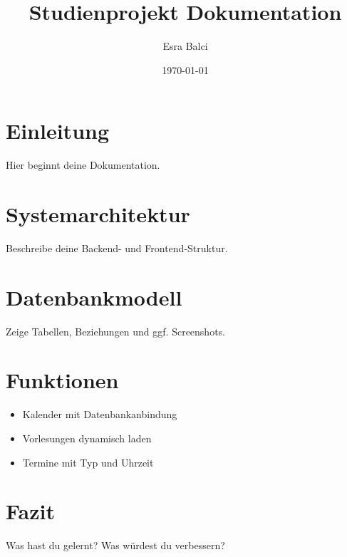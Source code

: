 \documentclass[a4paper,12pt]{article}
\title{Studienprojekt Dokumentation}
\author{Esra Balci}
\date{\today}
\begin{document}
\maketitle

\section{Einleitung}
Hier beginnt deine Dokumentation.

\section{Systemarchitektur}
Beschreibe deine Backend- und Frontend-Struktur.

\section{Datenbankmodell}
Zeige Tabellen, Beziehungen und ggf. Screenshots.

\section{Funktionen}
\begin{itemize}
  \item Kalender mit Datenbankanbindung
  \item Vorlesungen dynamisch laden
  \item Termine mit Typ und Uhrzeit
\end{itemize}

\section{Fazit}
Was hast du gelernt? Was würdest du verbessern?
\end{document}
